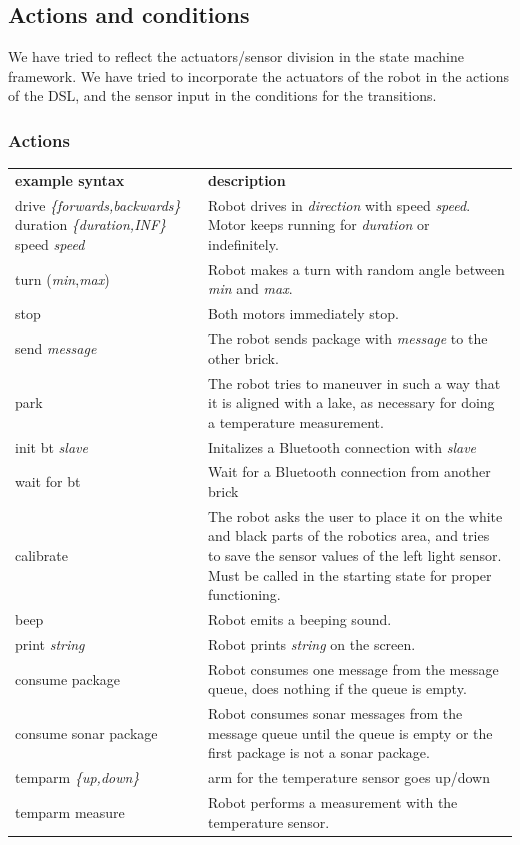 \documentclass[11pt,a4paper]{article}
\begin{document}
\subsection{Actions and conditions}
We have tried to reflect the actuators/sensor division in the state machine framework. We have tried to incorporate the actuators of the robot in the actions of the DSL, and the sensor input in the conditions for the transitions.

\subsubsection{Actions}
\begin{tabular}{p{6cm}p{10cm}}
\textbf{example syntax} & \textbf{description}\\
drive \emph{\{forwards,backwards\}} duration \emph{\{duration,INF\}} speed \emph{speed} & Robot drives in \emph{direction} with speed \emph{speed}. Motor keeps running for \emph{duration} or indefinitely.\\
turn (\emph{min},\emph{max}) & Robot makes a turn with random angle between \emph{min} and \emph{max}.\\
stop & Both motors immediately stop.\\
send \emph{message} & The robot sends package with \emph{message} to the other brick.\\
park & The robot tries to maneuver in such a way that it is aligned with a lake, as necessary for doing a temperature measurement.\\
init bt \emph{slave}& Initalizes a Bluetooth connection with \emph{slave}\\
wait for bt & Wait for a Bluetooth connection from another brick\\
calibrate & The robot asks the user to place it on the white and black parts of the robotics area, and tries to save the sensor values of the left light sensor. Must be called in the starting state for proper functioning.\\
beep & Robot emits a beeping sound.\\
print \emph{string} & Robot prints \emph{string} on the screen.\\
consume package & Robot consumes one message from the message queue, does nothing if the queue is empty.\\
consume sonar package & Robot consumes sonar messages from the message queue until the queue is empty or the first package is not a sonar package.\\
temparm \emph{\{up,down\}} & arm for the temperature sensor goes up/down\\
temparm measure & Robot performs a measurement with the temperature sensor.\\
\end{tabular}
\end{document}
